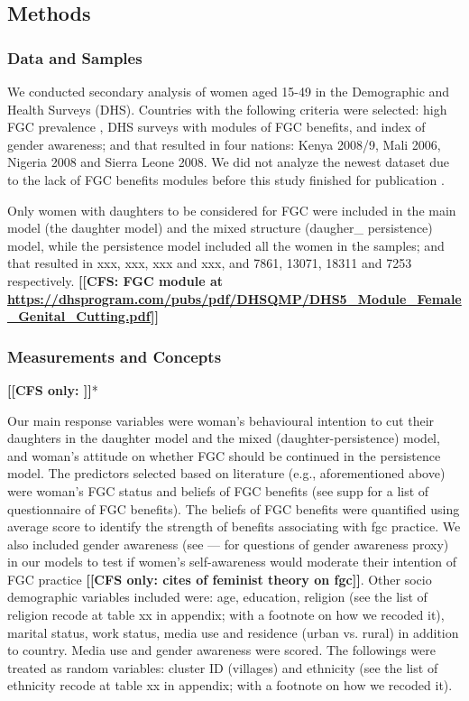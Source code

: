 \documentclass[12pt,]{article}
\newcommand{\comment}[1]{\textbf{[[#1]]}}
\newcommand{\cfcmt}[1]{\comment{CFS: #1}}
\newcommand{\cfonly}[1]{\comment{CFS only: #1}}
\begin{document}
\subsection{Methods}\label{methods}

\subsubsection{Data and Samples}\label{data-and-samples}

We conducted secondary analysis of women aged 15-49 in the Demographic and Health Surveys (DHS).  Countries with the following criteria were selected:  high FGC prevalence \cite{UNIC16}, DHS surveys with modules of FGC benefits, and index of gender awareness; and that resulted in four nations:  Kenya 2008/9, Mali 2006, Nigeria 2008 and Sierra Leone 2008.  We did not analyze the newest dataset due to the lack of FGC benefits modules before this study finished for publication .

Only women with daughters to be considered for FGC were included in the main model (the daughter model) and the mixed structure (daugher_ persistence) model, while the persistence model included all the women in the samples; and that resulted in xxx, xxx, xxx and xxx, and 7861, 13071, 18311 and 7253 respectively.  \cfcmt{FGC module at \url{https://dhsprogram.com/pubs/pdf/DHSQMP/DHS5_Module_Female_Genital_Cutting.pdf}}

\subsubsection{Measurements and Concepts}\label{measurements-and-concepts}

\cfonly{\cite{Rima08}}*

Our main response variables were woman's behavioural intention to cut their daughters in the daughter model and the mixed (daughter-persistence) model, and woman's attitude on whether FGC should be continued in the persistence model.  The predictors selected based on literature (e.g., aforementioned above) were woman's FGC status and beliefs of FGC benefits (see supp for a list of questionnaire of FGC benefits).  The beliefs of FGC benefits were quantified using average score  to identify the strength of benefits associating with fgc practice. We also included gender awareness (see — for questions of gender awareness proxy) in our models to test if women’s self-awareness would moderate  their intention of FGC practice \cfonly{cites of feminist theory on fgc}. Other socio demographic variables included were:  age, education, religion (see the list of religion recode at table xx in appendix; with a footnote on how we recoded it), marital status, work status, media use and residence (urban vs. rural) in addition to country.  Media use and gender awareness were scored.  The followings were treated as random variables:  cluster ID (villages) and ethnicity (see the list of ethnicity recode at table xx in appendix; with a footnote on how we recoded it).
\end{document}
